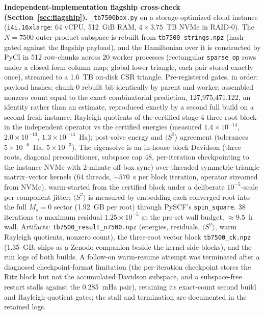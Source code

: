 \documentclass[11pt]{article}
\newcommand{\ssq}{\ensuremath{\langle S^2\rangle}}
\begin{document}
\textbf{Independent-implementation flagship cross-check (Section~\ref{sec:flagship}).} \texttt{\_tb7500box.py} on a storage-optimized cloud instance (\texttt{i4i.16xlarge}: 64 vCPU, 512~GiB RAM, $4\times3.75$~TB NVMe in RAID-0). The $N = 7500$ outer-product subspace is rebuilt from \texttt{tb7500\_strings.npz} (hash-gated against the flagship payload), and the Hamiltonian over it is constructed by PyCI in 512 row-chunks across 20 worker processes (rectangular \texttt{sparse\_op} rows under a closed-form column map; global lower triangle, each pair stored exactly once), streamed to a 1.6~TB on-disk CSR triangle. Pre-registered gates, in order: payload hashes; chunk-0 rebuilt bit-identically by parent and worker; assembled nonzero count equal to the exact combinatorial prediction, 127{,}975{,}471{,}122, an identity rather than an estimate, reproduced exactly by a second full build on a second fresh instance; Rayleigh quotients of the certified stage-4 three-root block in the independent operator vs the certified energies (measured $1.4\times10^{-14}$, $2.0\times10^{-13}$, $1.3\times10^{-13}$~Ha); post-solve energy and \ssq{} agreement (tolerances $5\times10^{-6}$~Ha, $5\times10^{-3}$). The eigensolve is an in-house block Davidson (three roots, diagonal preconditioner, subspace cap 48, per-iteration checkpointing to the instance NVMe with 2-minute off-box sync) over threaded symmetric-triangle matrix--vector kernels (64 threads, ${\sim}570$~s per block iteration, operator streamed from NVMe), warm-started from the certified block under a deliberate $10^{-5}$-scale per-component jitter; \ssq{} is measured by embedding each converged root into the full $M_s = 0$ sector (1.92~GB per root) through PySCF's \texttt{spin\_square}. 38 iterations to maximum residual $1.25\times10^{-5}$ at the pre-set wall budget, ${\approx}9.5$~h wall. Artifacts: \texttt{tb7500\_result\_n7500.npz} (energies, residuals, \ssq{}, warm Rayleigh quotients, nonzero count), the three-root vector block \texttt{tb7500\_ck.npz} (1.35~GB; ships as a Zenodo companion beside the kernel-side blocks), and the run logs of both builds. A follow-on warm-resume attempt was terminated after a diagnosed checkpoint-format limitation (the per-iteration checkpoint stores the Ritz block but not the accumulated Davidson subspace, and a subspace-free restart stalls against the 0.285~mHa pair), retaining its exact-count second build and Rayleigh-quotient gates; the stall and termination are documented in the retained logs.
\end{document}
